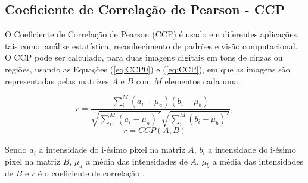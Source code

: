\begin{comment}

\subsection{THE PEARSON CORRELATION COEFFICIENT}

$CCP$ is used in statistical analyses, pattern recognition and computer vision. 
It can be used to comparing two images in an object recognition system. 
The following equation describes the $CCP$ method for two gray scale digital images\cite{Eugene},
represented by the matrices $A$ and $B$ with $M$ elements each one,
\begin{equation}
r = \frac{\sum \limits_{i}^{M} (a_i-\mu_a)(b_i-\mu_b)}{\sqrt{\sum \limits_{i}^{M} (a_i-\mu_a)^2} \sqrt{\sum\limits_{i}^{M} (b_i-\mu_b)^2}},
\end{equation}
\begin{equation}\label{eq:CCP}
 r=CCP(A,B)
\end{equation}

where $a_i$ is the intensity of the i-th pixel in the  matrix $A$, 
$b_i$ is the intensity of the i-th pixel in the matrix $B$, 
$\mu_a$ is the mean intensity of $A$,
$\mu_b$ is the mean intensity of $B$ and
$r$ is the correlation coefficient \cite{Miranda Neto}.

\end{comment}



\subsection{Coeficiente de Correlação de Pearson - CCP}

O Coeficiente de Correlação de Pearson (CCP) é usado em diferentes aplicações,  
tais como: análise estatística, reconhecimento de padrões e visão computacional. 
O CCP pode ser calculado, para duas imagens digitais 
em tons de cinzas \cite{Eugene} ou regiões, usando as Equações (\ref{eq:CCP0}) e (\ref{eq:CCP}), 
em que as imagens são representadas pelas matrizes $A$ e $B$ com $M$ elementos cada uma.

\begin{equation}\label{eq:CCP0}
r = \frac{\sum \limits_{i}^{M} (a_i-\mu_a)(b_i-\mu_b)}{\sqrt{\sum \limits_{i}^{M} (a_i-\mu_a)^2} \sqrt{\sum\limits_{i}^{M} (b_i-\mu_b)^2}},
\end{equation}
\begin{equation}\label{eq:CCP}
 r=CCP(A,B)
\end{equation}

Sendo $a_i$ a intensidade do i-ésimo pixel na matriz $A$, $b_i$ a intensidade do i-ésimo pixel na matriz
$B$, $\mu_a$ a média das intensidades de $A$, $\mu_b$ a média das intensidades de $B$ e $r$ é o coeficiente
de correlação \cite{Miranda Neto}.
